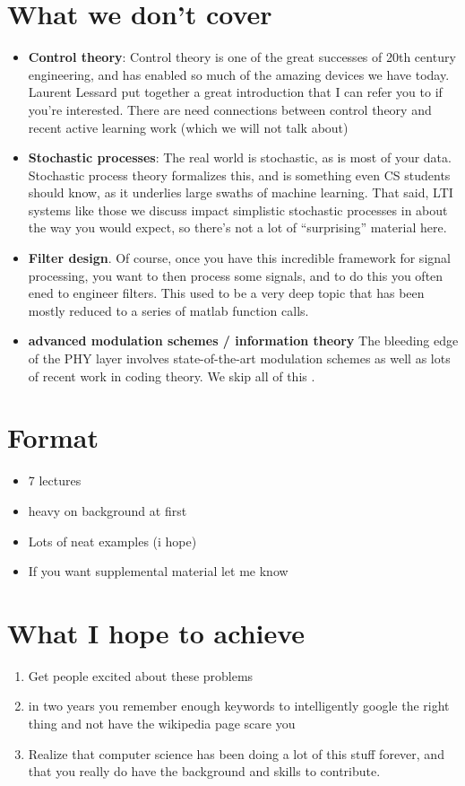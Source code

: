 \section{What we don't cover}
\begin{itemize}

\item \textbf{Control theory}: Control theory is one of
  the great successes of 20th century engineering, and has enabled so
  much of the amazing devices we have today. Laurent Lessard put
  together a great introduction that I can refer you to if you're
  interested. There are need connections between control theory and
  recent active learning work (which we will not talk about) 
\item \textbf{Stochastic processes}: The real world is stochastic, as is most of your
  data. Stochastic process theory formalizes this, and is something
  even CS students should know, as it underlies large swaths of
  machine learning. That said, LTI systems like those we discuss
  impact simplistic stochastic processes in about the way you would
  expect, so there's not a lot of ``surprising'' material here.
\item \textbf{Filter design}. Of course, once you have this incredible
  framework for signal processing, you want to then process some
  signals, and to do this you often ened to engineer filters. This
  used to be a very deep topic that has been mostly reduced to a
  series of matlab function calls.
\item \textbf{ advanced modulation schemes / information theory} The
  bleeding edge of the PHY layer involves state-of-the-art modulation
  schemes as well as lots of recent work in coding theory. We skip all
  of this .
\end{itemize} 

\section{Format}
\begin{itemize}
\item 7 lectures
\item heavy on background at first
\item Lots of neat examples (i hope)
\item If you want supplemental material let me know
\end{itemize} 

\section{What I hope to achieve}
\begin{enumerate}
\item Get people excited about these problems
\item in two years you remember enough keywords to intelligently
  google the right thing and not have the wikipedia page scare you
\item Realize that computer science has been doing a lot of this stuff
  forever, and that you really do have the background and skills to
  contribute.
\end{enumerate} 


